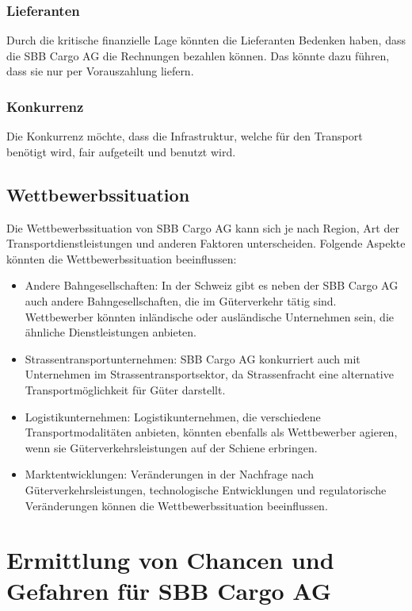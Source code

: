 \documentclass{article}
\begin{document}
\subsubsection{Lieferanten}
Durch die kritische finanzielle Lage könnten die Lieferanten Bedenken haben, dass die SBB Cargo AG die Rechnungen bezahlen können.
Das könnte dazu führen, dass sie nur per Vorauszahlung liefern.

\subsubsection{Konkurrenz}
Die Konkurrenz möchte, dass die Infrastruktur, welche für den Transport benötigt wird, fair aufgeteilt und benutzt wird.


\subsection{Wettbewerbssituation}
Die Wettbewerbssituation von SBB Cargo AG kann sich je nach Region, Art der Transportdienstleistungen und anderen Faktoren unterscheiden.
Folgende Aspekte könnten die Wettbewerbssituation beeinflussen: 

\begin{itemize}
    \item Andere Bahngesellschaften:
    In der Schweiz gibt es neben der SBB Cargo AG auch andere Bahngesellschaften, die im Güterverkehr tätig sind.
    Wettbewerber könnten inländische oder ausländische Unternehmen sein, die ähnliche Dienstleistungen anbieten. 
    \item Strassentransportunternehmen:
    SBB Cargo AG konkurriert auch mit Unternehmen im Strassentransportsektor, da Strassenfracht eine alternative Transportmöglichkeit für Güter darstellt. 
    \item Logistikunternehmen:
    Logistikunternehmen, die verschiedene Transportmodalitäten anbieten, könnten ebenfalls als Wettbewerber agieren, wenn sie Güterverkehrsleistungen auf der Schiene erbringen.
    \item Marktentwicklungen:
    Veränderungen in der Nachfrage nach Güterverkehrsleistungen, technologische Entwicklungen und regulatorische Veränderungen können die Wettbewerbssituation beeinflussen. 
\end{itemize}

\section{Ermittlung von Chancen und Gefahren für SBB Cargo AG}
\end{document}
